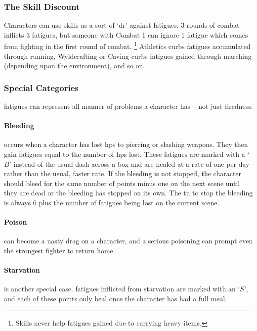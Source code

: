 \begin{multicols}{2}
\subsubsection{The Skill Discount}

Characters can use skills as a sort of `\gls{dr}' against \glspl{fatigue}.
3 \glspl{round} of combat inflicts 3 \glspl{fatigue}, but someone with Combat 1 can ignore 1 \gls{fatigue} which comes from fighting in the first round of combat.%
\footnote{Skills never help \glspl{fatigue} gained due to carrying heavy items.}
Athletics curbs \glspl{fatigue} accumulated through running, Wyldcrafting or Caving curbs \glspl{fatigue} gained through marching (depending upon the environment), and so on.

\subsubsection{Special Categories}

\Glspl{fatigue} can represent all manner of problems a character has -- not just tiredness.

\paragraph{Bleeding} occurs when a character has lost \glspl{hp} to piercing or slashing weapons.
They then gain \glspl{fatigue} equal to the number of \glspl{hp} lost.
These \glspl{fatigue} are marked with a `$B$' instead of the usual dash across a box and are healed at a rate of one per day rather than the usual, faster rate.
If the bleeding is not stopped, the character should bleed for the same number of points minus one on the next scene until they are dead or the bleeding has stopped on its own.
The \gls{tn} to stop the bleeding is always 6 plus the number of \glspl{fatigue} being lost on the current scene.

\paragraph{Poison} can become a nasty drag on a character, and a serious poisoning can prompt even the strongest fighter to return home.

\paragraph{Starvation} is another special case.
\glspl{fatigue} inflicted from starvation are marked with an `$S$', and each of these points only heal once the character has had a full meal.


\end{multicols}
